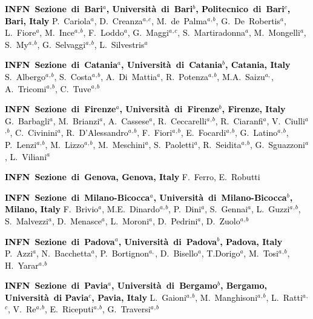 \textcolor{black}{\textbf{INFN~Sezione~di~Bari$^{a}$, Universit\`{a}~di~Bari$^{b}$, Politecnico~di~Bari$^{c}$, Bari, Italy}\newline
P.~Cariola$^{a}$, D.~Creanza$^{a}$$^{,}$$^{c}$, M.~de~Palma$^{a}$$^{,}$$^{b}$, G.~De~Robertis$^{a}$, L.~Fiore$^{a}$, M.~Ince$^{a}$$^{,}$$^{b}$, F.~Loddo$^{a}$, G.~Maggi$^{a}$$^{,}$$^{c}$, S.~Martiradonna$^{a}$,  M.~Mongelli$^{a}$, S.~My$^{a}$$^{,}$$^{b}$, G.~Selvaggi$^{a}$$^{,}$$^{b}$, L.~Silvestris$^{a}$}

\textcolor{black}{\textbf{INFN~Sezione~di~Catania$^{a}$, Universit\`{a}~di~Catania$^{b}$, Catania, Italy}\newline
S.~Albergo$^{a}$$^{,}$$^{b}$, S.~Costa$^{a}$$^{,}$$^{b}$, A.~Di~Mattia$^{a}$, R.~Potenza$^{a}$$^{,}$$^{b}$, M.A.~Saizu$^{a,}$, A.~Tricomi$^{a}$$^{,}$$^{b}$, C.~Tuve$^{a}$$^{,}$$^{b}$}

\textcolor{black}{
\textbf{INFN~Sezione~di~Firenze$^{a}$, Universit\`{a}~di~Firenze$^{b}$, Firenze, Italy}\newline
G.~Barbagli$^{a}$, M.~Brianzi$^{a}$, A.~Cassese$^{a}$, R.~Ceccarelli$^{a}$$^{,}$$^{b}$, R.~Ciaranfi$^{a}$, V.~Ciulli$^{a}$$^{,}$$^{b}$, C.~Civinini$^{a}$, R.~D'Alessandro$^{a}$$^{,}$$^{b}$, F.~Fiori$^{a}$$^{,}$$^{b}$, E.~Focardi$^{a}$$^{,}$$^{b}$, G.~Latino$^{a}$$^{,}$$^{b}$, P.~Lenzi$^{a}$$^{,}$$^{b}$, M.~Lizzo$^{a}$$^{,}$$^{b}$, M.~Meschini$^{a}$, S.~Paoletti$^{a}$, R.~Seidita$^{a}$$^{,}$$^{b}$, G.~Sguazzoni$^{a}$, L.~Viliani$^{a}$}

\textcolor{black}{\textbf{INFN~Sezione~di~Genova, Genova, Italy}\newline
F.~Ferro, E.~Robutti}

\textcolor{black}{\textbf{INFN~Sezione~di~Milano-Bicocca$^{a}$, Universit\`{a}~di~Milano-Bicocca$^{b}$, Milano, Italy}\newline
F.~Brivio$^{a}$, M.E.~Dinardo$^{a}$$^{,}$$^{b}$, P.~Dini$^{a}$, S.~Gennai$^{a}$, L.~Guzzi$^{a}$$^{,}$$^{b}$, S.~Malvezzi$^{a}$, D.~Menasce$^{a}$, L.~Moroni$^{a}$, D.~Pedrini$^{a}$, D.~Zuolo$^{a}$$^{,}$$^{b}$}

\textcolor{black}{\textbf{INFN~Sezione~di~Padova$^{a}$, Universit\`{a}~di~Padova$^{b}$, Padova, Italy}\newline
P.~Azzi$^{a}$, N.~Bacchetta$^{a}$, P.~Bortignon$^{a,}$, D.~Bisello$^{a}$, T.Dorigo$^{a}$, M.~Tosi$^{a}$$^{,}$$^{b}$, H.~Yarar$^{a}$$^{,}$$^{b}$}

\textcolor{black}{\textbf{INFN~Sezione~di~Pavia$^{a}$, Universit\`{a}~di~Bergamo$^{b}$, Bergamo, Universit\`{a}~di Pavia$^{c}$, Pavia, Italy}\newline
L.~Gaioni$^{a}$$^{,}$$^{b}$, M.~Manghisoni$^{a}$$^{,}$$^{b}$, L.~Ratti$^{a}$$^{,}$$^{c}$, V.~Re$^{a}$$^{,}$$^{b}$, E.~Riceputi$^{a}$$^{,}$$^{b}$, G.~Traversi$^{a}$$^{,}$$^{b}$}

